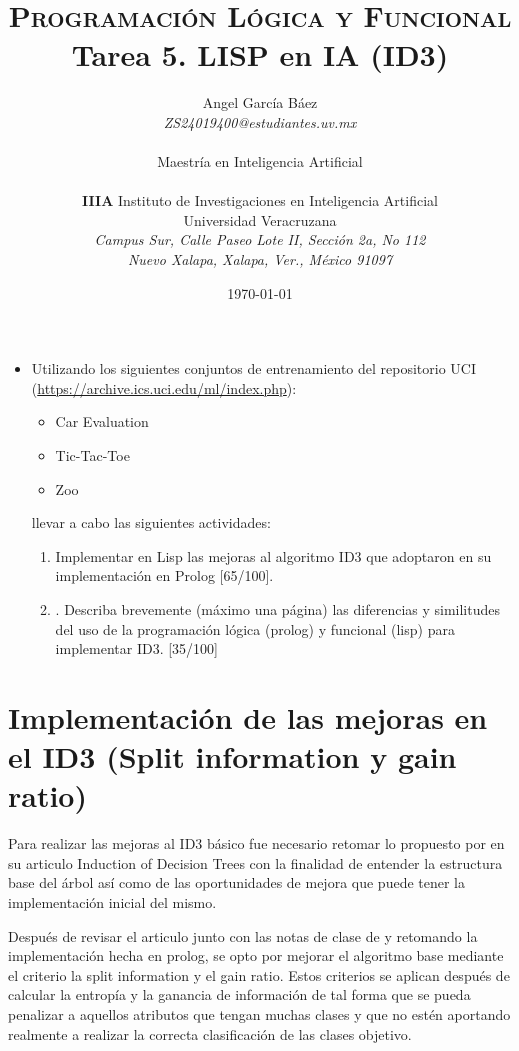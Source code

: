 \documentclass[11pt, letterpaper]{article}
\title{\textsc{Programación Lógica y Funcional} \\
	Tarea 5. LISP en IA (ID3)}
\author{Angel García Báez \\ \emph{ZS24019400@estudiantes.uv.mx} \\ \\
	Maestría en Inteligencia Artificial \\ \\ \textbf{IIIA}
	Instituto de Investigaciones en Inteligencia Artificial \\
	Universidad Veracruzana \\ \emph{Campus Sur, Calle Paseo Lote II,
		Sección 2a, No 112} \\ \emph{Nuevo Xalapa, Xalapa, Ver., México 91097}}
\date{\today}
\begin{document}
\maketitle



\begin{itemize}
	\item Utilizando los siguientes conjuntos de entrenamiento del repositorio UCI (\url{https://archive.ics.uci.edu/ml/index.php}):
	
	\begin{itemize}	
		\item Car Evaluation
		\item Tic-Tac-Toe
		\item Zoo
	\end{itemize}
	
	llevar a cabo las siguientes actividades:
	
	\begin{enumerate}
		\item Implementar en Lisp las mejoras al algoritmo ID3 que adoptaron en su implementación en Prolog [65/100].
		
		\item . Describa brevemente (máximo una página) las diferencias y similitudes del uso de la programación lógica (prolog) y funcional (lisp) para
		implementar ID3. [35/100]
		
	\end{enumerate}

\end{itemize}


\newpage

\section{Implementación de las mejoras en el ID3 (Split information y gain ratio)}

Para realizar las mejoras al ID3 básico fue necesario retomar lo propuesto por \cite{quinlan86} en su articulo Induction of Decision Trees con la finalidad de entender la estructura base del árbol así como de las oportunidades de mejora que puede tener la implementación inicial del mismo.

Después de revisar el articulo junto con las notas de clase de \cite{guerra2024} y retomando la implementación hecha en prolog, se opto por mejorar el algoritmo base mediante el criterio la split information y el gain ratio. Estos criterios se aplican después de calcular la entropía y la ganancia de información de tal forma que se pueda penalizar a aquellos atributos que tengan muchas clases y que no estén aportando realmente a realizar la correcta clasificación de las clases objetivo.
\end{document}
